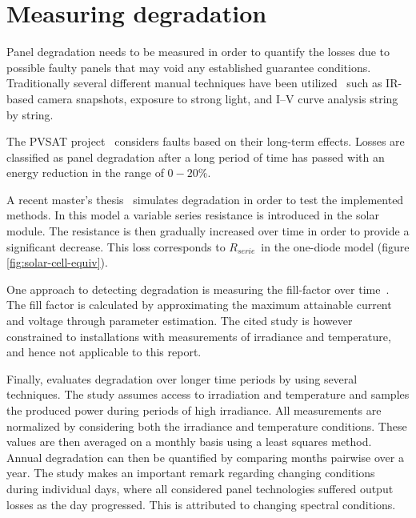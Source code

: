 \section{Measuring degradation}
Panel degradation needs to be measured in order to quantify the losses due to possible faulty panels that may void any established guarantee conditions.
Traditionally several different manual techniques have been utilized~\cite{Munoz2011} such as IR-based camera snapshots, exposure to strong light, and I–V curve analysis string by string.

The PVSAT project~\cite{Stettler2005} considers faults based on their long-term effects.
Losses are classified as panel degradation after a long period of time has passed with an energy reduction in the range of $0-20\%$.

A recent master's thesis~\cite{Zhao2010thesis} simulates degradation in order to test the implemented methods.
In this model a variable series resistance is introduced in the solar module.
The resistance is then gradually increased over time in order to provide a significant decrease.
This loss corresponds to $R_{serie}$ in the one-diode model (figure \ref{fig:solar-cell-equiv}).

One approach to detecting degradation is measuring the fill-factor over time~\cite{Raina2013}.
The fill factor is calculated by approximating the maximum attainable current and voltage through parameter estimation.
The cited study is however constrained to installations with measurements of irradiance and temperature, and hence not applicable to this report.

Finally, \cite{Makrides2010} evaluates degradation over longer time periods by using several techniques.
The study assumes access to irradiation and temperature and samples the produced power during periods of high irradiance.
All measurements are normalized by considering both the irradiance and temperature conditions.
These values are then averaged on a monthly basis using a least squares method.
Annual degradation can then be quantified by comparing months pairwise over a year.
The study makes an important remark regarding changing conditions during individual days, where all considered panel technologies suffered output losses as the day progressed.
This is attributed to changing spectral conditions.

